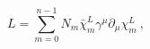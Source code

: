 \begin{equation}
L= \sum_{m=0}^{n-1} N_m\bar\chi_m^L\gamma^\mu\partial_\mu\chi_m^L~,
\label{ll}
\end{equation}

